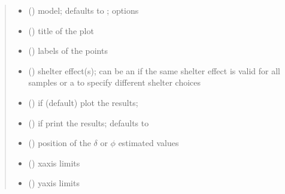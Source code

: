 \documentclass[letterpaper,10pt,english]{sphinxmanual}
\begin{document}
\begin{fulllineitems}
\begin{quote}
\begin{description}
\begin{itemize}
\item {} 
\sphinxAtStartPar
{} () \textendash{} model; defaults to ; options 

\item {} 
\sphinxAtStartPar
{} () \textendash{} title of the plot

\item {} 
\sphinxAtStartPar
{} () \textendash{} labels of the points

\item {} 
\sphinxAtStartPar
{} () \textendash{} shelter effect(s); can be an  if the same shelter
effect is valid for all samples or a  to specify different
shelter choices

\item {} 
\sphinxAtStartPar
{} () \textendash{} if  (default) plot the results;

\item {} 
\sphinxAtStartPar
{} () \textendash{} if  print the results; defaults to 

\item {} 
\sphinxAtStartPar
{} () \textendash{} position of the \(\delta\) or \(\phi\) estimated values

\item {} 
\sphinxAtStartPar
{} () \textendash{} x\sphinxhyphen{}axis limits

\item {} 
\sphinxAtStartPar
{} () \textendash{} y\sphinxhyphen{}axis limits


\end{itemize}
\end{description}
\end{quote}
\end{fulllineitems}
\end{document}
